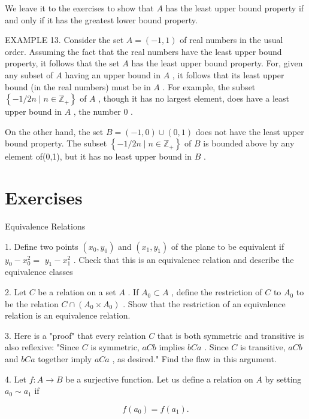 We leave it to the exercises to show that \(A\) has the least upper bound property if and only if it has the greatest lower bound property.

EXAMPLE 13. Consider the set \(A = \left( {-1,1}\right)\) of real numbers in the usual order. Assuming the fact that the real numbers have the least upper bound property, it follows that the set \(A\) has the least upper bound property. For, given any subset of \(A\) having an upper bound in \(A\) , it follows that its least upper bound (in the real numbers) must be in \(A\) . For example, the subset \(\left\{  {-1/{2n} \mid  n \in  {\mathbb{Z}}_{ + }}\right\}\) of \(A\) , though it has no largest element, does have a least upper bound in \(A\) , the number 0 .

On the other hand, the set \(B = \left( {-1,0}\right)  \cup  \left( {0,1}\right)\) does not have the least upper bound property. The subset \(\left\{  {-1/{2n} \mid  n \in  {\mathbb{Z}}_{ + }}\right\}\) of \(B\) is bounded above by any element of(0,1), but it has no least upper bound in \(B\) .

\section*{Exercises}

Equivalence Relations

1. Define two points \(\left( {{x}_{0},{y}_{0}}\right)\) and \(\left( {{x}_{1},{y}_{1}}\right)\) of the plane to be equivalent if \({y}_{0} - {x}_{0}^{2} =\)  \({y}_{1} - {x}_{1}^{2}\) . Check that this is an equivalence relation and describe the equivalence classes

2. Let \(C\) be a relation on a set \(A\) . If \({A}_{0} \subset  A\) , define the restriction of \(C\) to \({A}_{0}\) to be the relation \(C \cap  \left( {{A}_{0} \times  {A}_{0}}\right)\) . Show that the restriction of an equivalence relation is an equivalence relation.

3. Here is a "proof" that every relation \(C\) that is both symmetric and transitive is also reflexive: "Since \(C\) is symmetric, \({aCb}\) implies \({bCa}\) . Since \(C\) is transitive, \({aCb}\) and \({bCa}\) together imply \({aCa}\) , as desired." Find the flaw in this argument.

4. Let \(f : A \rightarrow  B\) be a surjective function. Let us define a relation on \(A\) by setting \({a}_{0} \sim  {a}_{1}\) if

\[
f\left( {a}_{0}\right)  = f\left( {a}_{1}\right) .
\]

